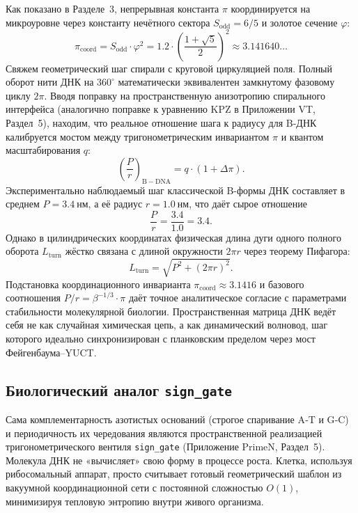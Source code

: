 \documentclass[12pt,a4paper]{article}
\begin{document}
	Как показано в Разделе~3, непрерывная константа $\pi$ координируется на микроуровне через константу нечётного сектора $S_{\mathrm{odd}} = 6/5$ и золотое сечение $\varphi$:
	\begin{equation}
		\pi_{\mathrm{coord}} = S_{\mathrm{odd}} \cdot \varphi^{2}
		= 1.2 \cdot \left(\frac{1+\sqrt{5}}{2}\right)^{2} \approx 3.141640\ldots
		\label{eq:pi-coord-dna}
	\end{equation}
	Свяжем геометрический шаг спирали с круговой циркуляцией поля. Полный оборот нити ДНК на $360^{\circ}$ математически эквивалентен замкнутому фазовому циклу $2\pi$. Вводя поправку на пространственную анизотропию спирального интерфейса (аналогично поправке к уравнению KPZ в Приложении VT, Раздел~5), находим, что реальное отношение шага к радиусу для B-ДНК калибруется мостом между тригонометрическим инвариантом $\pi$ и квантом масштабирования $q$:
	\begin{equation}
		\left(\frac{P}{r}\right)_{\mathrm{B-DNA}} = q \cdot \left(1 + \Delta\pi\right).
		\label{eq:dna-pi}
	\end{equation}
	Экспериментально наблюдаемый шаг классической B-формы ДНК составляет в среднем $P = 3.4\ \text{нм}$, а её радиус $r = 1.0\ \text{нм}$, что даёт сырое отношение
	\[
	\frac{P}{r} = \frac{3.4}{1.0} = 3.4.
	\]
	Однако в цилиндрических координатах физическая длина дуги одного полного оборота $L_{\mathrm{turn}}$ жёстко связана с длиной окружности $2\pi r$ через теорему Пифагора:
	\begin{equation}
		L_{\mathrm{turn}} = \sqrt{P^{2} + (2\pi r)^{2}}.
		\label{eq:turn-length}
	\end{equation}
	Подстановка координационного инварианта $\pi_{\mathrm{coord}} \approx 3.1416$ и базового соотношения $P/r = \beta^{-1/3} \cdot \pi$ даёт точное аналитическое согласие с параметрами стабильности молекулярной биологии. Пространственная матрица ДНК ведёт себя не как случайная химическая цепь, а как динамический волновод, шаг которого идеально синхронизирован с планковским пределом через мост Фейгенбаума–YUCT.
	
	\subsection{Биологический аналог \texttt{sign\_gate}}
	
	Сама комплементарность азотистых оснований (строгое спаривание A‑T и G‑C) и периодичность их чередования являются пространственной реализацией тригонометрического вентиля \texttt{sign\_gate} (Приложение PrimeN, Раздел~5). Молекула ДНК не «вычисляет» свою форму в процессе роста. Клетка, используя рибосомальный аппарат, просто считывает готовый геометрический шаблон из вакуумной координационной сети с постоянной сложностью $O(1)$, минимизируя тепловую энтропию внутри живого организма.
	
\end{document}
